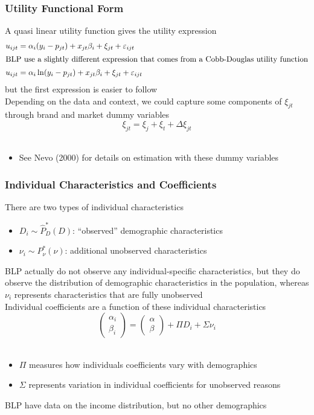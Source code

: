 \documentclass{beamer}
\begin{document}
\begin{frame}\frametitle{Utility Functional Form}
    A quasi linear utility function gives the utility expression
    \begin{align*}
    u_{ijt} &= \alpha_i (y_i - p_{jt}) + x_{jt} \beta_i + \xi_{jt} + \varepsilon_{ijt} \\
    \intertext{BLP use a slightly different expression that comes from a Cobb-Douglas utility function}
    u_{ijt} &= \alpha_i \ln(y_i - p_{jt}) + x_{jt} \beta_i + \xi_{jt} + \varepsilon_{ijt}
    \end{align*}
    but the first expression is easier to follow \\
    \vspace{2ex}
    Depending on the data and context, we could capture some components of $\xi_{jt}$ through brand and market dummy variables
    $$\xi_{jt} = \xi_j + \xi_t + \Delta \xi_{jt}$$\\
    \begin{itemize}
        \item See Nevo (2000) for details on estimation with these dummy variables
    \end{itemize}
\end{frame}

\begin{frame}\frametitle{Individual Characteristics and Coefficients}
    There are two types of individual characteristics
    \begin{itemize}
        \item $D_i \sim \hat{P}_D^*(D)$: ``observed'' demographic characteristics
        \item $\nu_i \sim P_{\nu}^*(\nu)$: additional unobserved characteristics
    \end{itemize}
    BLP actually do not observe any individual-specific characteristics, but they do observe the distribution of demographic characteristics in the population, whereas $\nu_i$ represents characteristics that are fully unobserved \\
    \vspace{2ex}
    Individual coefficients are a function of these individual characteristics
    $$\begin{pmatrix}
        \alpha_i \\
        \beta_i
    \end{pmatrix} = \begin{pmatrix}
        \alpha \\
        \beta
    \end{pmatrix} + \Pi D_i + \Sigma \nu_i$$ \\
    \vspace{-1ex}
    \begin{itemize}
        \item $\Pi$ measures how individuals coefficients vary with demographics
        \item $\Sigma$ represents variation in individual coefficients for unobserved reasons
    \end{itemize}
    \vspace{2ex}
    BLP have data on the income distribution, but no other demographics
\end{frame}
\end{document}
